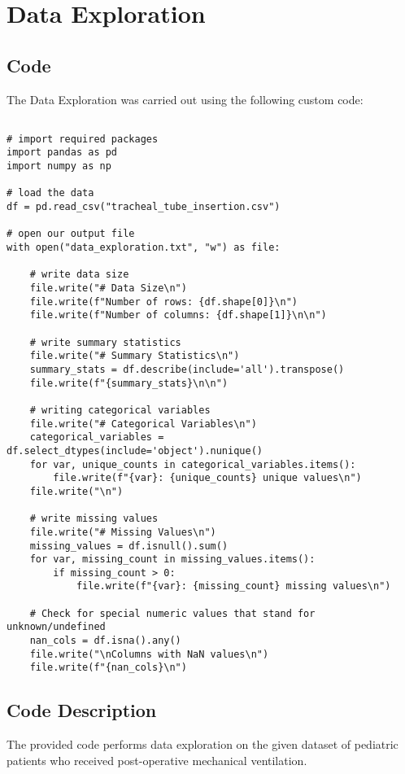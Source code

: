 \documentclass[11pt]{article}
\begin{document}
\section{Data Exploration}
\subsection{{Code}}
The Data Exploration was carried out using the following custom code:

\begin{verbatim}

# import required packages
import pandas as pd
import numpy as np

# load the data
df = pd.read_csv("tracheal_tube_insertion.csv")

# open our output file
with open("data_exploration.txt", "w") as file:
    
    # write data size
    file.write("# Data Size\n")
    file.write(f"Number of rows: {df.shape[0]}\n")
    file.write(f"Number of columns: {df.shape[1]}\n\n")
    
    # write summary statistics
    file.write("# Summary Statistics\n")
    summary_stats = df.describe(include='all').transpose()
    file.write(f"{summary_stats}\n\n")

    # writing categorical variables
    file.write("# Categorical Variables\n")
    categorical_variables = df.select_dtypes(include='object').nunique()
    for var, unique_counts in categorical_variables.items():
        file.write(f"{var}: {unique_counts} unique values\n")
    file.write("\n")

    # write missing values
    file.write("# Missing Values\n")
    missing_values = df.isnull().sum()
    for var, missing_count in missing_values.items():
        if missing_count > 0:
            file.write(f"{var}: {missing_count} missing values\n")
            
    # Check for special numeric values that stand for unknown/undefined
    nan_cols = df.isna().any()
    file.write("\nColumns with NaN values\n")
    file.write(f"{nan_cols}\n")

\end{verbatim}

\subsection{Code Description}

The provided code performs data exploration on the given dataset of pediatric patients who received post-operative mechanical ventilation. 
\end{document}

